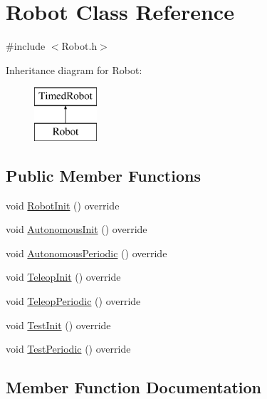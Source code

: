 \hypertarget{classRobot}{}\section{Robot Class Reference}
\label{classRobot}


{\ttfamily \#include $<$Robot.\+h$>$}

Inheritance diagram for Robot\+:\begin{figure}[H]
\begin{center}
\leavevmode
\includegraphics[height=2.000000cm]{classRobot}
\end{center}
\end{figure}
\subsection*{Public Member Functions}
\begin{DoxyCompactItemize}
\item 
void \hyperlink{classRobot_a66f23dae271748d525cf3ab046375f79}{Robot\+Init} () override
\item 
void \hyperlink{classRobot_a2136cfc015936285218c8a8db984d6bc}{Autonomous\+Init} () override
\item 
void \hyperlink{classRobot_ac11143dd674e0e02fef5329e2df24830}{Autonomous\+Periodic} () override
\item 
void \hyperlink{classRobot_aa3e246794bfbbb4406fc87f351762038}{Teleop\+Init} () override
\item 
void \hyperlink{classRobot_a324322627c63b3870daf7c7ddc5bea63}{Teleop\+Periodic} () override
\item 
void \hyperlink{classRobot_a9ac222d45d30a6d0c572fd36d18c6ccc}{Test\+Init} () override
\item 
void \hyperlink{classRobot_af0ac44a962e609e9b042285e699d1db8}{Test\+Periodic} () override
\end{DoxyCompactItemize}


\subsection{Member Function Documentation}
\mbox{\label{classRobot_a2136cfc015936285218c8a8db984d6bc}} 
